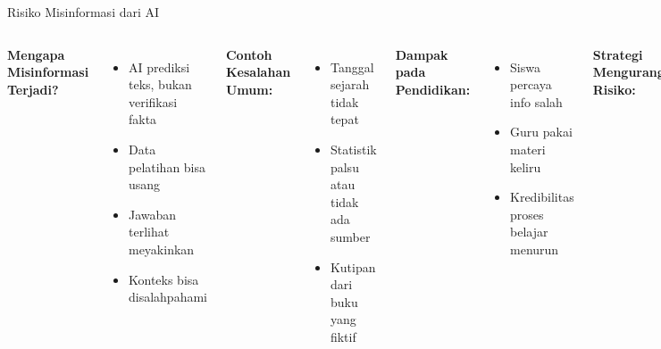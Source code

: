 \documentclass[aspectratio=169, table]{beamer}
\begin{document}
	
	\begin{frame}[fragile]{Risiko Misinformasi dari AI}
		\vspace{6pt}
		\begin{columns}[T]
			\textbf{Mengapa Misinformasi Terjadi?}
			\begin{itemize}
				\item AI prediksi teks, bukan verifikasi fakta
				\item Data pelatihan bisa usang
				\item Jawaban terlihat meyakinkan
				\item Konteks bisa disalahpahami
			\end{itemize}
			
			\textbf{Contoh Kesalahan Umum:}
			\begin{itemize}
				\item Tanggal sejarah tidak tepat
				\item Statistik palsu atau tidak ada sumber
				\item Kutipan dari buku yang fiktif
			\end{itemize}
			
			\textbf{Dampak pada Pendidikan:}
			\begin{itemize}
				\item Siswa percaya info salah
				\item Guru pakai materi keliru
				\item Kredibilitas proses belajar menurun
			\end{itemize}
			
			\textbf{Strategi Mengurangi Risiko:}
			\begin{itemize}
				\item Verifikasi jawaban AI secara mandiri
				\item Gunakan prompt dengan batasan tahun
				\item Ajarkan siswa cek ulang ke sumber
			\end{itemize}
		\end{columns}
	\end{frame}
	
\end{document}
